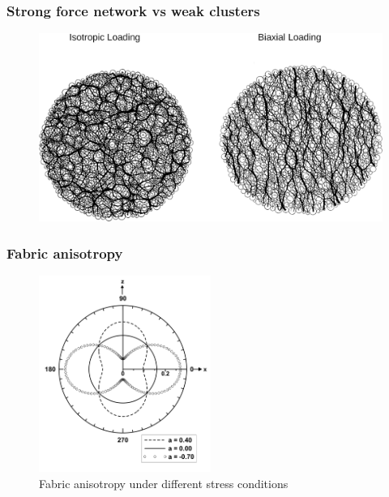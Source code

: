 \documentclass[notes]{beamer}
\begin{document}
\begin{frame}
	\frametitle{Strong force network vs weak clusters}
	\begin{figure}
		\includegraphics[width=\textwidth]{figs/force-network-weak-clusters.png}
	\end{figure}
\end{frame}

\begin{frame}
	\frametitle{Fabric anisotropy}
	\begin{figure}
		\includegraphics[width=0.5\textwidth]{figs/fabric-anisotropy.png}
		\caption*{Fabric anisotropy under different stress conditions}
	\end{figure}
\end{frame}
\end{document}
